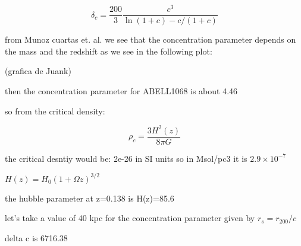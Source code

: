 \begin{equation}
\delta_{c}=\frac{200}{3}\frac{c^{3}}{\ln{(1+c)}-c/(1+c)}
\end{equation}

from Munoz cuartas et. al. we see that the concentration parameter depends on the mass and the redshift as we see in the following plot:

(grafica de Juank)

then the concentration parameter for ABELL1068 is about 4.46 

so from the critical density:

\begin{equation}
\rho_{c}=\frac{3H^2(z)}{8\pi G}
\end{equation}

the critical desntiy would be: 2e-26 in SI units so in Msol/pc3 it is $2.9\times 10^{-7}$

$H(z)=H_{0}(1+\Omega z)^{3/2}$

the hubble parameter at z=0.138 is H(z)=85.6

let's take a value of 40 kpc for the concentration parameter given by $r_{s}=r_{200}/c$

delta c is 6716.38



\newpage
